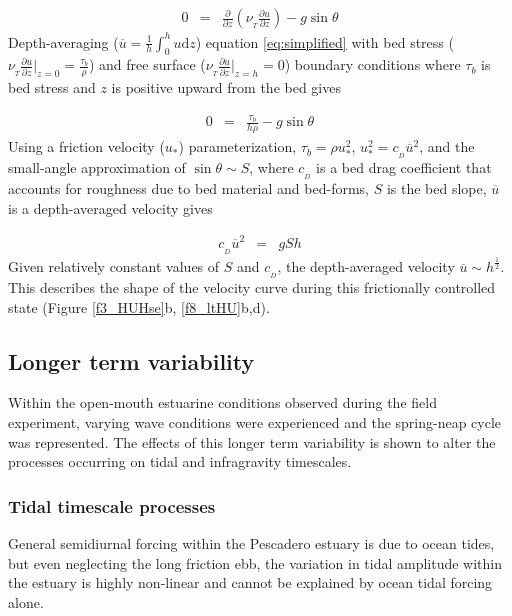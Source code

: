 \begin{eqnarray}
0 & = & \frac{\partial}{\partial z}\left(\nu_{_{T}}\frac{\partial u}{\partial z}\right)-g\sin\theta\label{eq:simplified}
\end{eqnarray}
Depth-averaging ($\overline{u}=\frac{1}{h}\int_{0}^{h}u\mathrm{d}z$)
equation \ref{eq:simplified} with bed stress ($\nu_{_{T}}\frac{\partial u}{\partial z}\Bigr|_{z=0}=\frac{\tau_{b}}{\rho}$)
and free surface ($\nu_{_{T}}\frac{\partial u}{\partial z}\Bigr|_{z=h}=0$)
boundary conditions where $\tau_{b}$ is bed stress and $z$ is positive
upward from the bed gives

\begin{eqnarray}
0 & = & \frac{\tau_{b}}{h\rho}-g\sin\theta\label{eq:fc_w_taubed}
\end{eqnarray}
Using a friction velocity ($u_{*}$) parameterization, $\tau_{b}=\rho u_{*}^{2}$,
$u_{*}^{2}=c_{_D}\overline{u}^{2}$, and the small-angle approximation
of $\sin\theta\sim S$, where $c_{_D}$ is a bed drag coefficient that
accounts for roughness due to bed material and bed-forms, $S$ is
the bed slope, $\overline{u}$ is a depth-averaged velocity gives

\begin{eqnarray}
c_{_D}\overline{u}^{2} & = & gSh\label{eq:frictionalcontrol}
\end{eqnarray}
 Given relatively constant values of $S$ and $c_{_D}$, the depth-averaged
velocity $\overline{u}\sim h^{\frac{1}{2}}$. This describes the shape
of the velocity curve during this frictionally controlled state (Figure
\ref{f3_HUHse}b, \ref{f8_ltHU}b,d).


\subsection{Longer term variability}

Within the open-mouth estuarine conditions observed during the field
experiment, varying wave conditions were experienced and the spring-neap
cycle was represented. The effects of this longer term variability
is shown to alter the processes occurring on tidal and infragravity
timescales. 


\subsubsection{Tidal timescale processes}

General semidiurnal forcing within the Pescadero estuary is due to
ocean tides, but even neglecting the long friction ebb, the variation
in tidal amplitude within the estuary is highly non-linear and cannot
be explained by ocean tidal forcing alone. 

